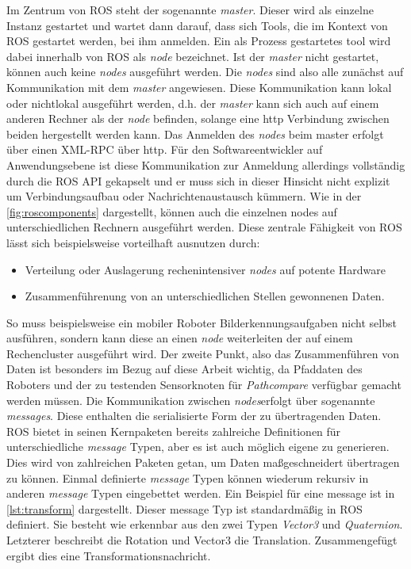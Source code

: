 Im Zentrum von ROS steht der sogenannte \textit{master}. Dieser wird als
einzelne Instanz gestartet und wartet dann darauf, dass sich Tools, die im
Kontext von ROS gestartet werden, bei ihm anmelden. Ein als Prozess gestartetes
tool wird dabei innerhalb von ROS als \textit{node} bezeichnet. Ist der
\textit{master} nicht gestartet, können auch keine \textit{nodes} ausgeführt 
werden. Die \textit{nodes} sind also alle zunächst auf Kommunikation mit dem
\textit{master} angewiesen. Diese Kommunikation kann lokal oder nichtlokal
ausgeführt werden, d.h. der \textit{master} kann sich auch auf einem anderen
Rechner als der \textit{node} befinden, solange eine http Verbindung zwischen
beiden hergestellt werden kann. Das Anmelden des \textit{nodes} beim
master erfolgt über einen \gls{XML-RPC} über http. Für den 
Softwareentwickler auf Anwendungsebene ist diese Kommunikation zur Anmeldung
allerdings
vollständig durch die ROS API gekapselt und er muss sich in dieser Hinsicht
nicht explizit um Verbindungsaufbau oder Nachrichtenaustausch kümmern. Wie in
der \autoref{fig:roscomponents} dargestellt, können auch die einzelnen nodes
auf unterschiedlichen Rechnern ausgeführt werden. Diese zentrale
Fähigkeit von ROS lässt sich beispielsweise vorteilhaft ausnutzen durch:

\begin{itemize}
  \item Verteilung oder Auslagerung rechenintensiver \textit{nodes} auf potente Hardware
  \item Zusammenführenung von an unterschiedlichen Stellen gewonnenen Daten.
\end{itemize}

So muss beispielsweise ein mobiler Roboter Bilderkennungsaufgaben nicht selbst
ausführen, sondern kann diese an einen \textit{node} weiterleiten der auf einem
Rechencluster ausgeführt wird. Der zweite Punkt, also das Zusammenführen von
Daten ist besonders im Bezug auf diese Arbeit wichtig, da Pfaddaten des
Roboters und der zu testenden Sensorknoten für \textit{Pathcompare} verfügbar
gemacht werden müssen. Die Kommunikation zwischen \textit{nodes}erfolgt über
sogenannte \textit{messages}. Diese enthalten die serialisierte Form der zu
übertragenden Daten. ROS bietet in seinen Kernpaketen bereits zahlreiche
Definitionen für unterschiedliche \textit{message} Typen, aber es ist auch
möglich eigene zu generieren. Dies wird von zahlreichen Paketen getan, um
Daten maßgeschneidert übertragen zu können. Einmal definierte \textit{message}
Typen können wiederum rekursiv in anderen \textit{message} Typen eingebettet 
werden. Ein Beispiel für eine message ist in \autoref{lst:transform}
dargestellt. Dieser message Typ ist standardmäßig in ROS definiert.
Sie besteht wie erkennbar aus den zwei Typen \textit{Vector3} und
\textit{Quaternion}. Letzterer beschreibt die Rotation und Vector3 die
Translation. Zusammengefügt ergibt dies eine Transformationsnachricht.

